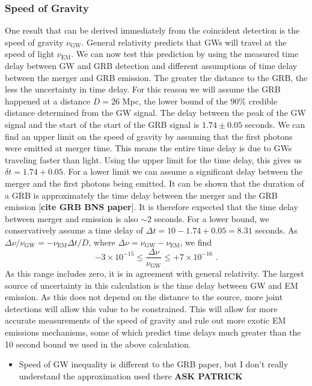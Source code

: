 \documentclass[11pt]{cuthesis}
\newcommand{\fs}{\text{ .}}
\begin{document}
\subsubsection{Speed of Gravity}
One result that can be derived immediately from the coincident detection is the speed of gravity $\nu_\text{GW}$. General relativity predicts that GWs will travel at the speed of light $\nu_\text{EM}$. We can now test this prediction by using the measured time delay between GW and GRB detection and different assumptions of time delay between the merger and GRB emission. The greater the distance to the GRB, the less the uncertainty in time delay. For this reason we will assume the GRB happened at a distance $D = 26$ Mpc, the lower bound of the $90\%$ credible distance determined from the GW signal.  The delay between the peak of the GW signal and the start of the start of the GRB signal is $1.74 \pm 0.05$ seconds. We can find an upper limit on the speed of gravity by assuming that the first photons were emitted at merger time. This means the entire time delay is due to GWs traveling faster than light. Using the upper limit for the time delay, this gives us $\delta t = 1.74 + 0.05$. For a lower limit we can assume a significant delay between the merger and the first photons being emitted. It can be shown that the duration of a GRB is approximately the time delay between the merger and the GRB emission [\textbf{cite GRB BNS paper}]. It is therefore expected that the time delay between merger and emission is also $\sim2$ seconds. For a lower bound, we conservatively assume a time delay of $\Delta t = 10 - 1.74 + 0.05= 8.31$ seconds. As $\Delta \nu /\nu_\text{GW} = -\nu_\text{EM}\Delta t/D$, where $\Delta \nu = \nu_\text{GW} - \nu_\text{EM}$, we find
\begin{equation}
-3 \times 10^{-15} \leq \frac{\Delta \nu}{\nu_\text{GW}} \leq +7\times 10^{-16} \fs
\end{equation}
As this range includes zero, it is in agreement with general relativity. The largest source of uncertainty in this calculation is the time delay between GW and EM emission. As this does not depend on the distance to the source, more joint detections will allow this value to be constrained. This will allow for more accurate measurements of the speed of gravity and rule out more exotic EM emissions mechanisms, some of which predict time delays much greater than the 10 second bound we used in the above calculation.
\begin{itemize}
\item Speed of GW inequality is different to the GRB paper, but I don't really understand the approximation used there \textbf{ASK PATRICK}
\end{itemize}
\end{document}
